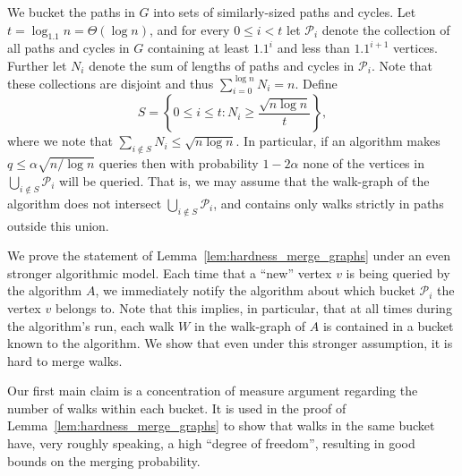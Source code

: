 \documentclass[11pt]{article}
\numberwithin{equation}{section}
\renewcommand{\P}{\mathcal{P}}
\newcommand{\1}{\mathbf{1}}
\begin{document}
We bucket the paths in $G$ into sets of similarly-sized paths and cycles. Let $t = \log_{1.1} n = \Theta(\log n)$, 
and for every $0 \leq i < t$ let $\mathcal{P}_i$ denote the collection of all paths and cycles in $G$ containing at least $1.1^i$ and less than $1.1^{i+1}$ vertices.
Further let $N_i$ denote the sum of lengths of paths and cycles in $\mathcal{P}_i$. Note that these collections are disjoint and thus $\sum_{i=0}^{\log n} N_i = n.$ Define
$$
S = \left\{ 0 \leq i \leq t : N_i \geq \frac{\sqrt{n \log n}}{t}  \right\},
$$
where we note that $\sum_{i \notin S} N_i \leq \sqrt{n \log n}$. In particular, if an algorithm makes $q \leq \alpha \sqrt{n / \log n}$ queries then with probability $1-2\alpha$ none of the vertices in $\bigcup_{i \notin S} \mathcal{P}_i$ will be queried. That is, we may assume that the walk-graph of the algorithm does not intersect $\bigcup_{i \notin S} \P_i$, and contains only walks strictly in paths outside this union.

We prove the statement of Lemma~\ref{lem:hardness_merge_graphs} under an even stronger algorithmic model. Each time that a ``new'' vertex $v$ is being queried by the algorithm $A$, we immediately notify the algorithm about which bucket $\P_i$ the vertex $v$ belongs to. Note that this implies, in particular, that at all times during the algorithm's run, each walk $W$ in the walk-graph of $A$ is contained in a bucket known to the algorithm. We show that even under this stronger assumption, it is hard to merge walks.

Our first main claim is a concentration of measure argument regarding the number of walks within each bucket. It is used in the proof of Lemma~\ref{lem:hardness_merge_graphs} to show that walks in the same bucket have, very roughly speaking, a high ``degree of freedom'', resulting in good bounds on the merging probability.
\end{document}
